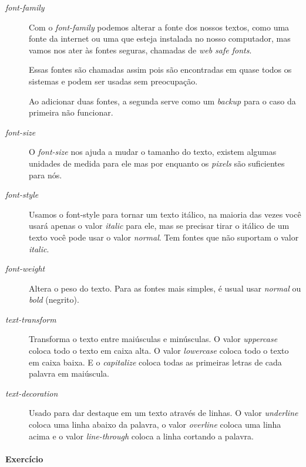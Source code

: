 \documentclass[12pt,a4paper]{article}
\begin{document}
	\begin{description}
		\item[\textit{font-family}] Com o \textit{font-family} podemos alterar a fonte dos nossos textos, como uma fonte da internet ou uma que esteja instalada no nosso computador, mas vamos nos ater às fontes seguras, chamadas de \textit{web safe fonts}.
		
		Essas fontes são chamadas assim pois são encontradas em quase todos os sistemas e podem ser usadas sem preocupação.
		
		Ao adicionar duas fontes, a segunda serve como um \textit{backup} para o caso da primeira não funcionar.
		
		\item[\textit{font-size}] O \textit{font-size} nos ajuda a mudar o tamanho do texto, existem algumas unidades de medida para ele mas por enquanto os \textit{pixels} são suficientes para nós.
		
		\item[\textit{font-style}] Usamos o font-style para tornar um texto itálico, na maioria das vezes você usará apenas o valor \textit{italic} para ele, mas se precisar tirar o itálico de um texto você pode usar o valor \textit{normal}. Tem fontes que não suportam o valor \textit{italic}.
		
		\item[\textit{font-weight}] Altera o peso do texto. Para as fontes mais simples, é usual usar \textit{normal} ou \textit{bold} (negrito).
		
		\item[\textit{text-transform}] Transforma o texto entre maiúsculas e minúsculas. O valor \textit{uppercase} coloca todo o texto em caixa alta. O valor \textit{lowercase} coloca todo o texto em caixa baixa. E o \textit{capitalize} coloca todas as primeiras letras de cada palavra em maiúscula.
		
		\item[\textit{text-decoration}] Usado para dar destaque em um texto através de linhas. O valor \textit{underline} coloca uma linha abaixo da palavra, o valor \textit{overline} coloca uma linha acima e o valor \textit{line-through} coloca a linha cortando a palavra.
	\end{description}
	
	\paragraph{Exercício} \mbox{}\\
	
\end{document}

